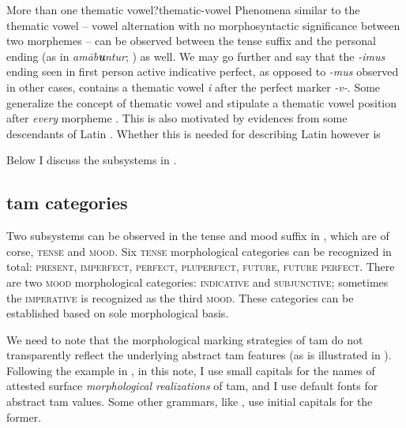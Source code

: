 \documentclass[a4paper, oneside, 12pt]{report}
\newcommand{\form}[1]{\emph{#1}}
\newcommand*{\category}[1]{\textsc{#1}}
\begin{document}
\begin{infobox}{More than one thematic vowel?}{thematic-vowel}
    Phenomena similar to the thematic vowel -- vowel alternation with no morphosyntactic significance 
    between two morphemes -- can be observed 
    between the tense suffix and the personal ending 
    (as in \form{am\={a}b\textbf{u}ntur}; ) as well.
    We may go further and say that
    the \form{-imus} ending seen in first person active indicative perfect,
    as opposed to \form{-mus} observed in other cases, 
    contains a thematic vowel \form{i} after the perfect marker \form{-v-}.
    Some generalize the concept of thematic vowel and 
    stipulate a thematic vowel position after \emph{every} morpheme
    \cite{embick2003latin}.
    This is also motivated by evidences from some descendants of Latin 
    \citep{oltra1999notion,oltra2005stress}.
    Whether this is needed for describing Latin however is 
\end{infobox}

\begin{table}[H]
    \centering
    \caption{Examples of Latin finite verbs}
    \label{tbl:latin-finite-verbs}
        
\end{table}

Below I discuss the subsystems in .


\subsection{\acs{tam} categories}\label{sec:verb-inflection.finite-template.tame}

Two subsystems can be observed in the tense and mood suffix in ,
which are of corse, \category{tense} and \category{mood}.
Six \category{tense} morphological categories can be recognized in total:
\category{present}, \category{imperfect}, \category{perfect}, \category{pluperfect}, \category{future}, \category{future perfect}.
There are two \category{mood} morphological categories:
\category{indicative} and \category{subjunctive};
sometimes the \category{imperative} is recognized as the third \category{mood}.
These categories can be established based on sole morphological basis. 

We need to note that the morphological marking strategies of \ac{tam}
do not transparently reflect the underlying abstract \ac{tam} features
(as is illustrated in ).
Following the example in \citet{grimm2021grammar},
in this note, I use small capitals for the names of attested surface \emph{morphological realizations} of \ac{tam},
and I use default fonts for abstract \ac{tam} values.
Some other grammars, like \citet{jacques2021grammar,friesen2017grammar}, 
use initial capitals for the former.
\end{document}
